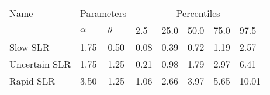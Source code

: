 \begin{tabular}{llllllll}
    \toprule
    Name          & \multicolumn{2}{c}{Parameters} & \multicolumn{5}{c}{Percentiles}                                     \\
    \cmidrule(lr){2-3}
    \cmidrule(lr){4-8}
                  & $\alpha$                       & $\theta$                        & 2.5  & 25.0 & 50.0 & 75.0 & 97.5  \\
    \midrule
    Slow SLR      & 1.75                           & 0.50                            & 0.08 & 0.39 & 0.72 & 1.19 & 2.57  \\
    Uncertain SLR & 1.75                           & 1.25                            & 0.21 & 0.98 & 1.79 & 2.97 & 6.41  \\
    Rapid SLR     & 3.50                           & 1.25                            & 1.06 & 2.66 & 3.97 & 5.65 & 10.01 \\
    \bottomrule
\end{tabular}
